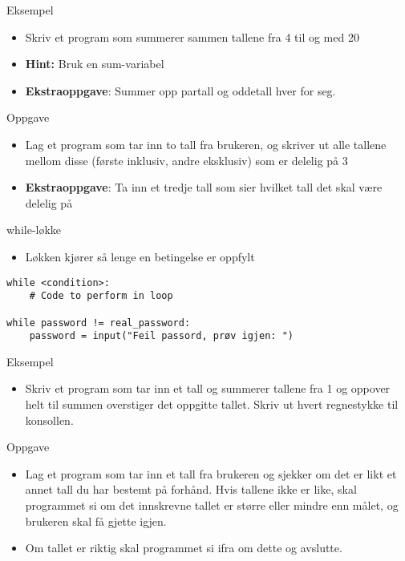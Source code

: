 \documentclass[screen, aspectratio=169]{beamer}
\begin{document}
\begin{frame}{Eksempel}
	\begin{itemize}
		\item Skriv et program som summerer sammen tallene fra 4 til og med 20
    		
		\item<2> \textbf{Hint: } Bruk en sum-variabel

		\item<2> \textbf{Ekstraoppgave}: Summer opp partall og oddetall hver for seg. 
	\end{itemize}
\end{frame}

\begin{frame}{Oppgave}
	\begin{itemize}
		\item Lag et program som tar inn to tall fra brukeren, og skriver ut alle tallene mellom disse (første inklusiv, andre eksklusiv) som er delelig på 3
		\item<2> \textbf{Ekstraoppgave}: Ta inn et tredje tall som sier hvilket tall det skal være delelig på
	\end{itemize}
\end{frame}

\begin{frame}[fragile]{while-løkke}
	\begin{itemize}
		\item Løkken kjører så lenge en betingelse er oppfylt
	\end{itemize}
	\begin{lstlisting}
while <condition>:
	# Code to perform in loop

while password != real_password:
	password = input("Feil passord, prøv igjen: ")
	\end{lstlisting}
\end{frame}

\begin{frame}{Eksempel}
	\begin{itemize}
		\item Skriv et program som tar inn et tall og summerer tallene fra 1 og oppover helt til summen overstiger det oppgitte tallet. Skriv ut hvert regnestykke til konsollen.
	\end{itemize}
\end{frame}

\begin{frame}{Oppgave}
	\begin{itemize}
		\item Lag et program som tar inn et tall fra brukeren og sjekker om det er likt et annet tall du har bestemt på forhånd. Hvis tallene ikke er like, skal programmet si om det innskrevne tallet er større eller mindre enn målet, og brukeren skal få gjette igjen.
		\item Om tallet er riktig skal programmet si ifra om dette og avslutte.
	\end{itemize}
\end{frame}
\end{document}
